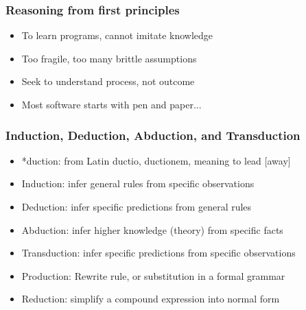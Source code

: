 \documentclass{beamer}
\begin{document}
  \begin{frame}
    \frametitle{Reasoning from first principles}
    \begin{itemize}
      \item To learn programs, cannot imitate knowledge
      \item Too fragile, too many brittle assumptions
      \item Seek to understand process, not outcome
      \item Most software starts with pen and paper...
    \end{itemize}
    \begin{figure}[H]
      \centering


    \end{figure}
  \end{frame}


  \begin{frame}
    \frametitle{Induction, Deduction, Abduction, and Transduction}
    \begin{itemize}
      \item *duction: from Latin ductio, ductionem, meaning to lead [away]
      \item Induction: infer general rules from specific observations
      \item Deduction: infer specific predictions from general rules
      \item Abduction: infer higher knowledge (theory) from specific facts
      \item Transduction: infer specific predictions from specific observations
      \item Production: Rewrite rule, or substitution in a formal grammar
      \item Reduction: simplify a compound expression into normal form
    \end{itemize}
  \end{frame}
\end{document}
